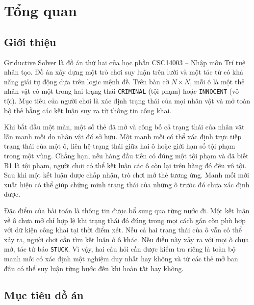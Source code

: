 \section{Tổng quan}
\label{sec:tongquan}

\subsection{Giới thiệu}

Griductive Solver là đồ án thứ hai của học phần CSC14003 -- Nhập môn
Trí tuệ nhân tạo. Đồ án xây dựng một trò chơi suy luận trên lưới và một
tác tử có khả năng giải tự động dựa trên logic mệnh đề. Trên bàn cờ
$N\times N$, mỗi ô là một thẻ nhân vật có một trong hai trạng thái
\texttt{CRIMINAL} (tội phạm) hoặc \texttt{INNOCENT} (vô tội). Mục tiêu
của người chơi là xác định trạng thái của mọi nhân vật và mở toàn bộ thẻ
bằng các kết luận suy ra từ thông tin công khai.

Khi bắt đầu một màn, một số thẻ đã mở và công bố cả trạng thái của nhân
vật lẫn manh mối do nhân vật đó sở hữu. Một manh mối có thể xác định trực
tiếp trạng thái của một ô, liên hệ trạng thái giữa hai ô hoặc giới hạn
số tội phạm trong một vùng. Chẳng hạn, nếu hàng đầu tiên có đúng một
tội phạm và đã biết B1 là tội phạm, người chơi có thể kết luận các ô
còn lại trên hàng đó đều vô tội. Sau khi một kết luận được chấp nhận,
trò chơi mở thẻ tương ứng. Manh mối mới xuất hiện có thể giúp chứng minh
trạng thái của những ô trước đó chưa xác định được.

Đặc điểm của bài toán là thông tin được bổ sung qua từng nước đi. Một
kết luận về ô chưa mở chỉ hợp lệ khi trạng thái đó đúng trong mọi cách
gán còn phù hợp với dữ kiện công khai tại thời điểm xét. Nếu cả hai
trạng thái của ô vẫn có thể xảy ra, người chơi cần tìm kết luận ở ô
khác. Nếu điều này xảy ra với mọi ô chưa mở, tác tử báo \texttt{STUCK}.
Vì vậy, hai câu hỏi cần được kiểm tra riêng là toàn bộ manh mối có xác
định một nghiệm duy nhất hay không và từ các thẻ mở ban đầu có thể suy
luận từng bước đến khi hoàn tất hay không.

\subsection{Mục tiêu đồ án}

